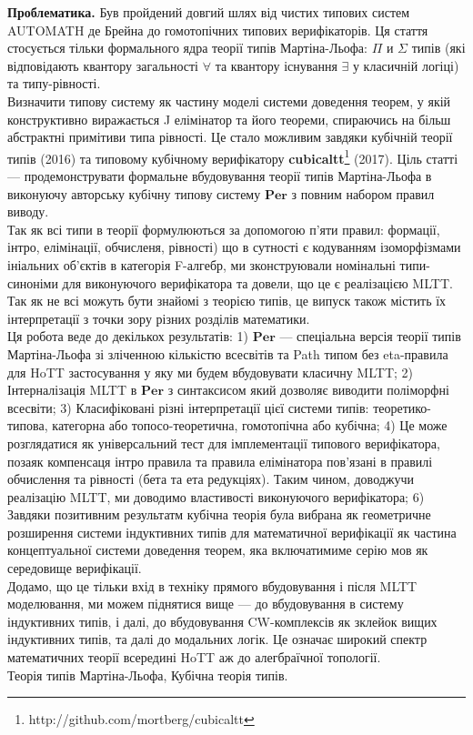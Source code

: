 \documentclass{article}
\theoremstyle{definition}
\begin{document}
{\bf Проблематика.}
Був пройдений довгий шлях від чистих типових систем AUTOMATH де Брейна до
гомотопічних типових верифікаторів. Ця стаття стосується тільки формального ядра
теорії типів Мартіна-Льофа: $\Pi$ и $\Sigma$ типів (які відповідають
квантору загальності $\forall$ та квантору існування $\exists$ у класичній логіці)
та типу-рівності.\\
Визначити типову систему як частину моделі системи доведення теорем,
у якій конструктивно виражається J елімінатор та його теореми, спираючись на більш абстрактні
примітиви типа рівності. Це стало можливим завдяки кубічній теорії типів (2016) та типовому кубічному верифікатору
{\bf cubicaltt}\footnote{http://github.com/mortberg/cubicaltt} (2017).
Ціль статті --- продемонструвати формальне вбудовування теорії типів Мартіна-Льофа
в виконуючу авторську кубічну типову систему $\mathbf{Per}$ з повним набором правил виводу.\\
Так як всі типи в теорії формулюються за допомогою п'яти
правил: формації, інтро, елімінації, обчисленя, рівності) що в сутності
є кодуванням ізоморфізмами ініальних об'єктів в категорія F-алгебр, ми зконструювали
номінальні типи-синоніми для виконуючого верифікатора та довели, що це є реалізацією MLTT.
Так як не всі можуть бути знайомі з теорією типів,
це випуск також містить їх інтерпретації з точки зору різних розділів математики.\\
Ця робота веде до декількох результатів:
1) $\mathbf{Per}$ --- спеціальна версія теорії типів Мартіна-Льофа зі зліченною кількістю всесвітів та Path типом без eta-правила для HoTT застосування у яку ми будем вбудовувати класичну MLTT;
2) Інтерналізація MLTT в $\mathbf{Per}$ з синтаксисом який дозволяє виводити поліморфні всесвіти;
3) Класифіковані різні інтерпретації цієї системи типів: теоретико-типова, категорна або топосо-теоретична, гомотопічна або кубічна;
4) Це може розглядатися як універсальний тест для імплементації типового верифікатора,
позаяк компенсаця інтро правила та правила елімінатора пов'язані в правилі
обчислення та рівності (бета та ета редукціях). Таким чином, доводжучи реалізацію MLTT,
ми доводимо властивості виконуючого верифікатора;
6) Завдяки позитивним результатм кубічна теорія була вибрана як геометричне розширення системи індуктивних типів
для математичної верифікації як частина концептуальної системи доведення теорем, яка включатимиме серію мов
як середовище верифікації.\\
Додамо, що це тільки вхід в техніку прямого вбудовування і після MLTT моделювання,
ми можем піднятися вище — до вбудовування в систему індуктивних типів, і далі,
до вбудовування CW-комплексів як зклейок вищих індуктивних типів, та далі до модальних логік.
Це означає широкий спектр математичних теорії всередині HoTT аж до алегбраїчної топології. \\
 Теорія типів Мартіна-Льофа, Кубічна теорія типів.
\vspace{1cm}
\end{document}
